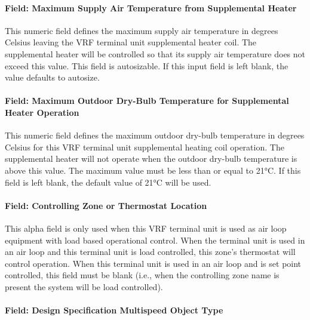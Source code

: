 \paragraph{Field: Maximum Supply Air Temperature from Supplemental Heater}\label{field-maximum-supply-air-temperature-from-supplemental-heater-2-000}

This numeric field defines the maximum supply air temperature in degrees Celsius leaving the VRF terminal unit supplemental heater coil. The supplemental heater will be controlled so that its supply air temperature does not exceed this value. This field is autosizable. If this input field is left blank, the value defaults to autosize.

\paragraph{Field: Maximum Outdoor Dry-Bulb Temperature for Supplemental Heater Operation}\label{field-maximum-outdoor-dry-bulb-temperature-for-supplemental-heater-operation-2-000}

This numeric field defines the maximum outdoor dry-bulb temperature in degrees Celsius for this VRF terminal unit supplemental heating coil operation. The supplemental heater will not operate when the outdoor dry-bulb temperature is above this value. The maximum value must be less than or equal to 21\si{\degreeCelsius}. If this field is left blank, the default value of 21\si{\degreeCelsius} will be used.

\paragraph{Field: Controlling Zone or Thermostat Location}\label{controlling-zone-or-thermostat-location-2-110}

This alpha field is only used when this VRF terminal unit is used as air loop equipment with load based operational control. When the terminal unit is used in an air loop and this terminal unit is load controlled, this zone's thermostat will control operation. When this terminal unit is used in an air loop and is set point controlled, this field must be blank (i.e., when the controlling zone name is present the system will be load controlled).

\paragraph{Field: Design Specification Multispeed Object Type}\label{field-design-specification-multispeed-object-type-3}

